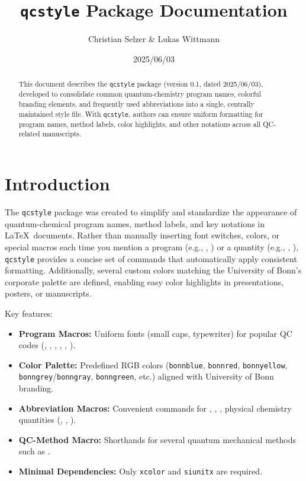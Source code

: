 \documentclass[a4paper,12pt]{article}
\title{\texttt{qcstyle} Package Documentation}
\author{Christian Selzer \& Lukas Wittmann}
\date{2025/06/03}
\begin{document}
\maketitle

\begin{abstract}
This document describes the \texttt{qcstyle} package (version 0.1, dated 2025/06/03), developed to consolidate common quantum-chemistry program names, colorful branding elements, and frequently used abbreviations into a single, centrally maintained style file. With \texttt{qcstyle}, authors can ensure uniform formatting for program names, method labels, color highlights, and other notations across all QC-related manuscripts. 
\end{abstract}

\tableofcontents
\bigskip

\section{Introduction}
The \texttt{qcstyle} package was created to simplify and standardize the appearance of quantum-chemical program names, method labels, and key notations in \LaTeX\ documents. Rather than manually inserting font switches, colors, or special macros each time you mention a program (e.g., \orca, \xtb) or a quantity (e.g., \pka, \dgsolv), \texttt{qcstyle} provides a concise set of commands that automatically apply consistent formatting. Additionally, several custom colors matching the University of Bonn’s corporate palette are defined, enabling easy color highlights in presentations, posters, or manuscripts.  

\medskip
Key features:
\begin{itemize}
  \item \textbf{Program Macros:} Uniform fonts (small caps, typewriter) for popular QC codes (\orca, \censo, \draco, \crest, \xtb, \tblite).
  \item \textbf{Color Palette:} Predefined RGB colors (\texttt{bonnblue}, \texttt{bonnred}, \texttt{bonnyellow}, \texttt{bonngrey}/\texttt{bonngray}, \texttt{bonngreen}, etc.) aligned with University of Bonn branding.
  \item \textbf{Abbreviation Macros:} Convenient commands for \etal, \ie, \eg, physical chemistry quantities (\pka, \dgsolv, \kcalpmol).
  \item \textbf{QC-Method Macro:} Shorthands for several quantum mechanical methods such as  .
  \item \textbf{Minimal Dependencies:} Only \texttt{xcolor} and \texttt{siunitx} are required. 
\end{itemize}
\end{document}

